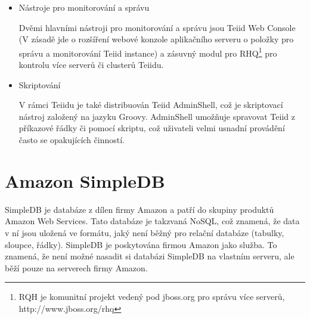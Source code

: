 \documentclass[oneside,12pt,final]{fithesis2}
\begin{document}
\begin{itemize}
\begin{itemize}
  \item Nástroje pro monitorování a správu
  
  Dvěmi hlavními nástroji pro monitorování a správu jsou Teiid Web Console (V zásadě jde o rozšíření webové konzole aplikačního serveru o položky pro správu a monitorování Teiid instance) a zásuvný modul pro RHQ\footnote{RQH je komunitní projekt vedený pod jboss.org pro správu více serverů, http://www.jboss.org/rhq} pro kontrolu více serverů či clusterů Teiidu.
  
  \item Skriptování
  
  V rámci Teiidu je také distribuován Teiid AdminShell, což je skriptovací nástroj založený na jazyku Groovy. AdminShell umožňuje spravovat Teiid z příkazové řádky či pomocí skriptu, což uživateli velmi usnadní provádění často se opakujících činností.
  
  \end{itemize}

\end{itemize}

\chapter{Amazon SimpleDB}
SimpleDB je databáze z dílen firmy Amazon a patří do skupiny produktů Amazon Web Services. Tato databáze je takzvaná NoSQL, což znamená, že data v ní jsou uložená ve formátu, jaký není běžný pro relační databáze (tabulky, sloupce, řádky). SimpleDB je poskytována firmou Amazon jako služba. To znamená, že není možné nasadit si databázi SimpleDB na vlastním serveru, ale běží pouze na serverech firmy Amazon. 
\end{document}
